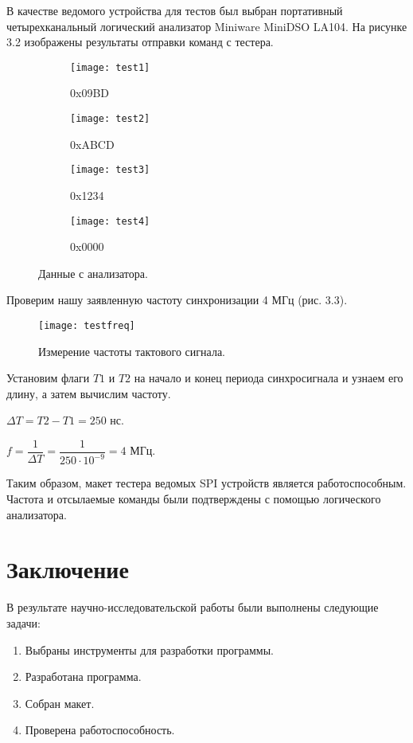 \documentclass[14pt, oneside]{altsu-report}
\begin{document}
	В качестве ведомого устройства для тестов был выбран портативный четырехканальный логический анализатор Miniware MiniDSO LA104. На рисунке 3.2 изображены результаты отправки команд с тестера.
	
\begin{figure}[H]
\centering
\begin{subfigure}[t]{0.45\textwidth}
\texttt{[image: test1]}
\caption{0x09BD}
\end{subfigure}
\hfill     
\begin{subfigure}[t]{0.45\textwidth}
\texttt{[image: test2]}
\caption{0xABCD}
\end{subfigure}
\hfill         
\begin{subfigure}[t]{0.45\textwidth}
\texttt{[image: test3]}
\caption{0x1234}
\end{subfigure}
\hfill         
\begin{subfigure}[t]{0.45\textwidth}
\texttt{[image: test4]}
\caption{0x0000}
\end{subfigure}     
\caption{Данные с анализатора.}
\end{figure}

	\newpage
	Проверим нашу заявленную частоту синхронизации 4 МГц (рис. 3.3). 
    \begin{figure}[H]
	\begin{center}
	\texttt{[image: testfreq]} 
	\end{center}	
	\caption{Измерение частоты тактового сигнала.}
	\end{figure}	
	
	Установим флаги $T1$ и $T2$ на начало и конец периода синхросигнала и узнаем его длину, а затем вычислим частоту. 
	
	$\Delta T=T2-T1=250$ нс.
	
	$f=\dfrac{1}{\Delta T}=\dfrac{1}{250 \cdot 10^{-9}}=4$ МГц.
	
	Таким образом, макет тестера ведомых SPI устройств является работоспособным. Частота и отсылаемые команды были подтверждены с помощью логического анализатора.
	

\chapter*{Заключение}
	В результате научно-исследовательской работы были выполнены следующие задачи:
	\begin{enumerate}
		\item Выбраны инструменты для разработки программы.
		\item Разработана программа.
		\item Собран макет.
		\item Проверена работоспособность.
	\end{enumerate}
	
\end{document}
